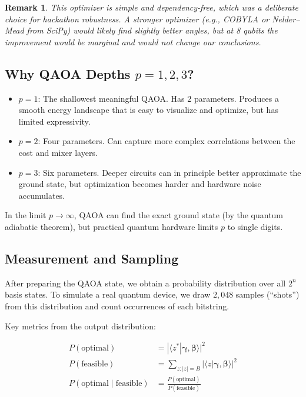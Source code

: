 \documentclass[12pt, a4paper]{article}
\newtheorem{remark}{Remark}[section]
\begin{document}
\begin{remark}
This optimizer is simple and dependency-free, which was a deliberate choice
for hackathon robustness. A stronger optimizer (e.g., COBYLA or Nelder--Mead
from SciPy) would likely find slightly better angles, but at 8 qubits the
improvement would be marginal and would not change our conclusions.
\end{remark}

\subsection{Why QAOA Depths $p = 1, 2, 3$?}

\begin{itemize}
    \item $p = 1$: The shallowest meaningful QAOA. Has $2$ parameters. Produces
    a smooth energy landscape that is easy to visualize and optimize, but has
    limited expressivity.
    \item $p = 2$: Four parameters. Can capture more complex correlations
    between the cost and mixer layers.
    \item $p = 3$: Six parameters. Deeper circuits can in principle better
    approximate the ground state, but optimization becomes harder and hardware
    noise accumulates.
\end{itemize}

In the limit $p \to \infty$, QAOA can find the exact ground state (by the
quantum adiabatic theorem), but practical quantum hardware limits $p$ to
single digits.

\subsection{Measurement and Sampling}

After preparing the QAOA state, we obtain a probability distribution over all
$2^n$ basis states. To simulate a real quantum device, we draw $2{,}048$
samples (``shots'') from this distribution and count occurrences of each
bitstring.

Key metrics from the output distribution:

\begin{align}
P(\text{optimal}) &= |\langle z^* | \bm{\gamma}, \bm{\beta}\rangle|^2 \\
P(\text{feasible}) &= \sum_{z : |z| = B} |\langle z | \bm{\gamma}, \bm{\beta}\rangle|^2 \\
P(\text{optimal} \mid \text{feasible}) &= \frac{P(\text{optimal})}{P(\text{feasible})}
\end{align}
\end{document}
